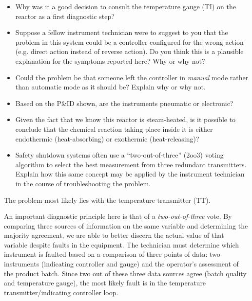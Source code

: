 \begin{itemize}
\item{} Why was it a good decision to consult the temperature gauge (TI) on the reactor as a first diagnostic step?
\item{} Suppose a fellow instrument technician were to suggest to you that the problem in this system could be a controller configured for the wrong action (e.g. direct action instead of reverse action).  Do you think this is a plausible explanation for the symptoms reported here?  Why or why not?
\item{} Could the problem be that someone left the controller in {\it manual} mode rather than automatic mode as it should be?  Explain why or why not.
\item{} Based on the P\&ID shown, are the instruments pneumatic or electronic?
\item{} Given the fact that we know this reactor is steam-heated, is it possible to conclude that the chemical reaction taking place inside it is either endothermic (heat-absorbing) or exothermic (heat-releasing)?
\item{} Safety shutdown systems often use a ``two-out-of-three'' (2oo3) voting algorithm to select the best measurement from three redundant transmitters.  Explain how this same concept may be applied by the instrument technician in the course of troubleshooting the problem.
\end{itemize}













The problem most likely lies with the temperature transmitter (TT).

\vskip 10pt

An important diagnostic principle here is that of a {\it two-out-of-three} vote.  By comparing three sources of information on the same variable and determining the majority agreement, we are able to better discern the actual value of that variable despite faults in the equipment.  The technician must determine which instrument is faulted based on a comparison of three points of data: two instruments (indicating controller and gauge) and the operator's assessment of the product batch.  Since two out of these three data sources agree (batch quality and temperature gauge), the most likely fault is in the temperature transmitter/indicating controller loop.

